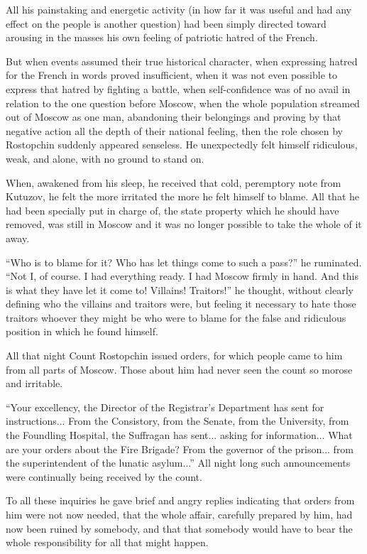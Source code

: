 All his painstaking and energetic activity (in how far it was
useful and had any effect on the people is another question) had
been simply directed toward arousing in the masses his own
feeling of patriotic hatred of the French.

But when events assumed their true historical character, when
expressing hatred for the French in words proved insufficient,
when it was not even possible to express that hatred by fighting
a battle, when self-confidence was of no avail in relation to the
one question before Moscow, when the whole population streamed
out of Moscow as one man, abandoning their belongings and proving
by that negative action all the depth of their national feeling,
then the role chosen by Rostopchin suddenly appeared
senseless. He unexpectedly felt himself ridiculous, weak, and
alone, with no ground to stand on.

When, awakened from his sleep, he received that cold, peremptory
note from Kutuzov, he felt the more irritated the more he felt
himself to blame. All that he had been specially put in charge
of, the state property which he should have removed, was still in
Moscow and it was no longer possible to take the whole of it
away.

``Who is to blame for it? Who has let things come to such a
pass?'' he ruminated. ``Not I, of course. I had everything
ready. I had Moscow firmly in hand. And this is what they have
let it come to! Villains!  Traitors!'' he thought, without
clearly defining who the villains and traitors were, but feeling
it necessary to hate those traitors whoever they might be who
were to blame for the false and ridiculous position in which he
found himself.

All that night Count Rostopchin issued orders, for which people
came to him from all parts of Moscow. Those about him had never
seen the count so morose and irritable.

``Your excellency, the Director of the Registrar's Department has
sent for instructions... From the Consistory, from the Senate,
from the University, from the Foundling Hospital, the Suffragan
has sent...  asking for information... What are your orders about
the Fire Brigade?  From the governor of the prison... from the
superintendent of the lunatic asylum...'' All night long such
announcements were continually being received by the count.

To all these inquiries he gave brief and angry replies indicating
that orders from him were not now needed, that the whole affair,
carefully prepared by him, had now been ruined by somebody, and
that that somebody would have to bear the whole responsibility
for all that might happen.

